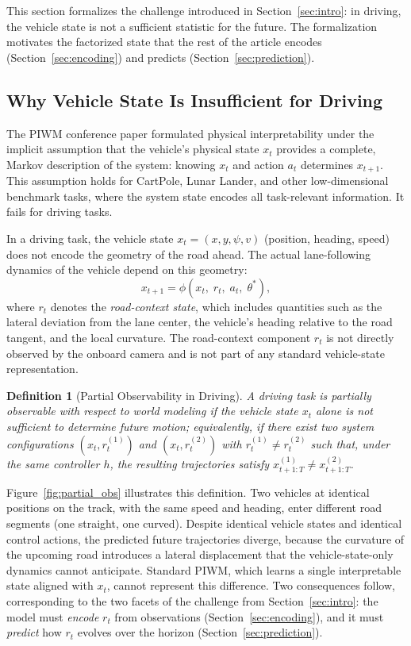 \documentclass[preprint,12pt]{elsarticle}
\newtheorem{definition}{Definition}
\begin{document}
This section formalizes the challenge introduced in Section~\ref{sec:intro}:
in driving, the vehicle state is not a sufficient statistic for the future.
The formalization motivates the factorized state that the rest of the article
encodes (Section~\ref{sec:encoding}) and predicts (Section~\ref{sec:prediction}).

\subsection{Why Vehicle State Is Insufficient for Driving}

The PIWM conference paper formulated physical interpretability under the implicit
assumption that the vehicle's physical state $x_t$ provides a complete, Markov
description of the system: knowing $x_t$ and action $a_t$ determines $x_{t+1}$.
This assumption holds for CartPole, Lunar Lander, and other low-dimensional
benchmark tasks, where the system state encodes all task-relevant information.
It fails for driving tasks.

In a driving task, the vehicle state $x_t = (x, y, \psi, v)$ (position, heading,
speed) does not encode the geometry of the road ahead.
The actual lane-following dynamics of the vehicle depend on this geometry:
\begin{equation}
    x_{t+1} = \phi(x_t,\; r_t,\; a_t,\; \theta^*),
    \label{eq:augmented_dyn}
\end{equation}
where $r_t$ denotes the \emph{road-context state}, which includes quantities such
as the lateral deviation from the lane center, the vehicle's heading relative to
the road tangent, and the local curvature.
The road-context component $r_t$ is not directly observed by the onboard camera
and is not part of any standard vehicle-state representation.

\begin{definition}[Partial Observability in Driving]
\label{def:partial_obs}
A driving task is \emph{partially observable} with respect to world modeling if
the vehicle state $x_t$ alone is not sufficient to determine future motion;
equivalently, if there exist two system configurations $(x_t, r_t^{(1)})$ and
$(x_t, r_t^{(2)})$ with $r_t^{(1)} \neq r_t^{(2)}$ such that, under the same
controller $h$, the resulting trajectories satisfy
$x_{t+1:T}^{(1)} \neq x_{t+1:T}^{(2)}$.
\end{definition}

Figure~\ref{fig:partial_obs} illustrates this definition.
Two vehicles at identical positions on the track, with the same speed and
heading, enter different road segments (one straight, one curved).
Despite identical vehicle states and identical control actions, the predicted
future trajectories diverge, because the curvature of the upcoming road
introduces a lateral displacement that the vehicle-state-only dynamics cannot
anticipate.
Standard PIWM, which learns a single interpretable state aligned with $x_t$,
cannot represent this difference.
Two consequences follow, corresponding to the two facets of the challenge from
Section~\ref{sec:intro}: the model must \emph{encode} $r_t$ from observations
(Section~\ref{sec:encoding}), and it must \emph{predict} how $r_t$ evolves over
the horizon (Section~\ref{sec:prediction}).
\end{document}

